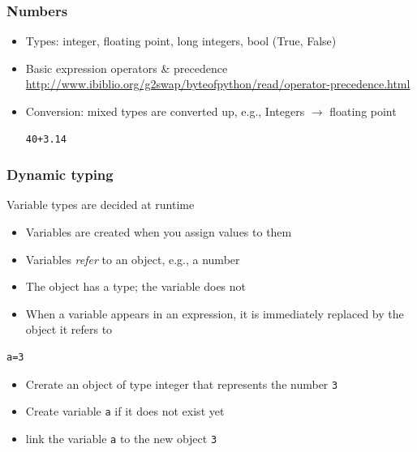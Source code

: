 \documentclass{beamer}
\begin{document}
\begin{frame}[containsverbatim]
\frametitle{Numbers}
\begin{itemize}
\item Types: integer, floating point, long integers, bool (True, False)
\item Basic expression operators \& precedence
\url{http://www.ibiblio.org/g2swap/byteofpython/read/operator-precedence.html}  
\item Conversion: mixed types are converted up, e.g., Integers $\rightarrow$ floating point
\begin{lstlisting}
40+3.14
\end{lstlisting}
\end{itemize}
\end{frame}

\begin{frame}[containsverbatim]
\frametitle{Dynamic typing}
Variable types are decided at runtime
\begin{itemize}
\item Variables are created when you assign values to them
\item Variables {\em refer} to an object, e.g., a number
\item The object has a type; the variable does not
\item When a variable appears in an expression, it is immediately replaced by the object it refers to
\end{itemize}
\begin{example}
\begin{lstlisting}
a=3
\end{lstlisting}
\begin{itemize}
\item Crerate an object of type integer that represents the number \texttt{3}
\item Create variable \texttt{a} if it does not exist yet
\item link the variable \texttt{a} to the new object \texttt{3}
\end{itemize}
\end{example}
\end{frame}
\end{document}
